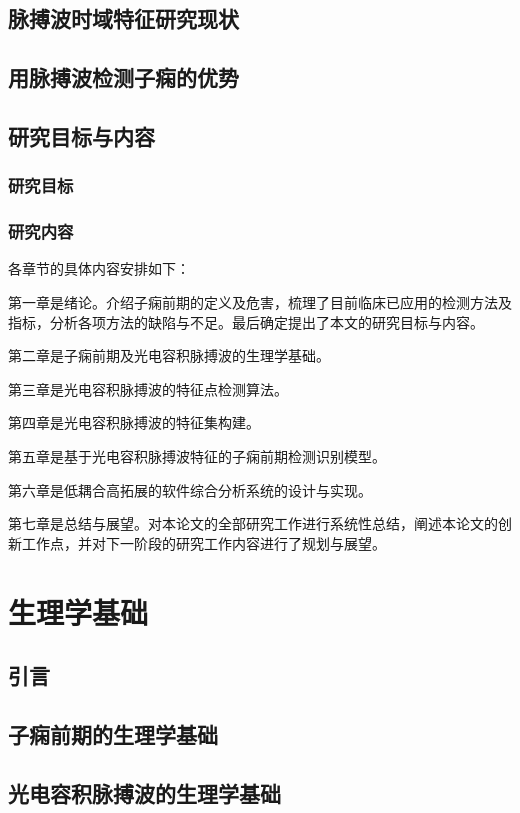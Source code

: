 \section{脉搏波时域特征研究现状}
\section{用脉搏波检测子痫的优势}
\section{研究目标与内容}

\subsection{研究目标}
\subsection{研究内容}

各章节的具体内容安排如下：

第一章是绪论。介绍子痫前期的定义及危害，梳理了目前临床已应用的检测方法及指标，分析各项方法的缺陷与不足。最后确定提出了本文的研究目标与内容。

第二章是子痫前期及光电容积脉搏波的生理学基础。

第三章是光电容积脉搏波的特征点检测算法。

第四章是光电容积脉搏波的特征集构建。

第五章是基于光电容积脉搏波特征的子痫前期检测识别模型。

第六章是低耦合高拓展的软件综合分析系统的设计与实现。

第七章是总结与展望。对本论文的全部研究工作进行系统性总结，阐述本论文的创新工作点，并对下一阶段的研究工作内容进行了规划与展望。


\chapter{生理学基础}
\section{引言}
\section{子痫前期的生理学基础}
\section{光电容积脉搏波的生理学基础}
